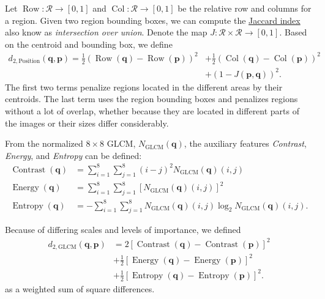 \documentclass[letterpaper]{article}
\begin{document}
Let $\operatorname{Row}: \mathcal{R} \rightarrow \left[0, 1\right]$ and
$\operatorname{Col}: \mathcal{R} \rightarrow \left[0, 1\right]$ be the relative
row and columns for a region. Given two region bounding boxes, we can compute
the \href{https://en.wikipedia.org/wiki/Jaccard_index}{Jaccard index} also know
as \emph{intersection over union}. Denote the map
$J: \mathcal{R} \times \mathcal{R} \rightarrow [0,1]$. Based on the centroid and
bounding box, we define
\begin{equation}
  \begin{split}
  d_{2,\text{Position}}\left(\mathbf{q}, \mathbf{p}\right)
  = \frac{1}{2}\left(
    \operatorname{Row}\left(\mathbf{q}\right) - \operatorname{Row}\left(\mathbf{p}\right)
    \right)^2 &+
    \frac{1}{2}\left(
      \operatorname{Col}\left(\mathbf{q}\right) - \operatorname{Col}\left(\mathbf{p}\right)
    \right)^2 \\
    &+ \left(1 - J\left(\mathbf{p}, \mathbf{q}\right)\right)^2.
  \end{split}
  \label{eqn:distance_2_position}
\end{equation}
The first two terms penalize regions located in the different areas by their
centroids. The last term uses the region bounding boxes and penalizes regions
without a lot of overlap, whether because they are located in different parts of
the images or their sizes differ considerably.

From the normalized $8 \times 8$ GLCM, $N_{\text{GLCM}}\left(\mathbf{q}\right)$,
the auxiliary features \emph{Contrast}, \emph{Energy}, and \emph{Entropy} can
be defined:
\begin{align}
  \operatorname{Contrast}\left(
  \mathbf{q}
  \right) &= \sum_{i=1}^8\sum_{j=1}^8\left(i - j\right)^2
            N_{\text{GLCM}}\left(\mathbf{q}\right)(i, j) \\
  \operatorname{Energy}\left(
  \mathbf{q}
  \right) &= \sum_{i=1}^8\sum_{j=1}^8
            \left[N_{\text{GLCM}}\left(\mathbf{q}\right)(i, j)\right]^2 \\
  \operatorname{Entropy}\left(
  \mathbf{q}
  \right) &= -\sum_{i=1}^8\sum_{j=1}^8
            N_{\text{GLCM}}\left(\mathbf{q}\right)(i, j)\log_2N_{\text{GLCM}}\left(\mathbf{q}\right)(i, j).
\end{align}

Because of differing scales and levels of importance, we defined
\begin{equation}
  \begin{split}
  d_{2,\text{GLCM}}\left(\mathbf{q}, \mathbf{p}\right)
  &= 2\left[
    \operatorname{Contrast}\left(\mathbf{q}\right) -
    \operatorname{Contrast}\left(\mathbf{p}\right)
  \right]^2 \\
  &+ \frac{1}{2}\left[
    \operatorname{Energy}\left(\mathbf{q}\right) -
    \operatorname{Energy}\left(\mathbf{p}\right)
  \right]^2 \\
  &+ \frac{1}{2}\left[
    \operatorname{Entropy}\left(\mathbf{q}\right) -
    \operatorname{Entropy}\left(\mathbf{p}\right)
  \right]^2.
  \end{split}
  \label{eqn:distance_2_glcm}
\end{equation}
as a weighted sum of square differences.
\end{document}
